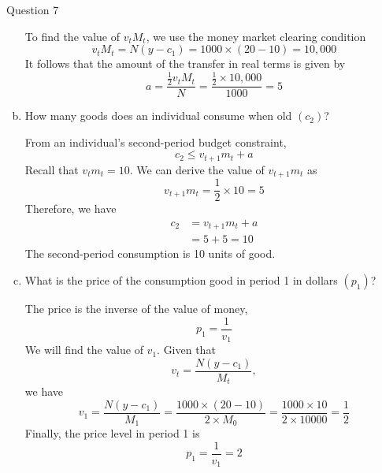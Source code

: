 \documentclass[a4paper]{article}
\newif\IfInSansMode
\numberwithin{equation}{section}
\numberwithin{figure}{section}
\begin{document}
\begin{questionbox}{Question 7}
\begin{enumerate}[(a)]
\begin{explanationbox}
\[				\]
				To find the value of \( v_tM_t \), we use the money market clearing condition
				\[
					v_tM_t = N(y-c_1) = 1000 \times (20-10) = 10,000
				\]
				It follows that the amount of the transfer in real terms is given by
				\[
					a = \frac{\frac{1}{2}v_tM_t}{N} = \frac{\frac{1}{2}\times 10,000}{1000} =  5
				\]
			\end{explanationbox}
			\item How many goods does an individual consume when old \( (c_2) \)?
			\begin{explanationbox}
				From an individual's second-period budget constraint,
				\[
					c_2 \leq v_{t+1}m_t + a
				\]
				Recall that \( v_tm_t = 10 \). We can derive the value of \( v_{t+1}m_t \) as
				\[
					v_{t+1}m_t = \frac{1}{2} \times 10 = 5
				\]
				Therefore, we have
				\begin{align*}
					c_2 &= v_{t+1}m_t + a\\
					&= 5 + 5 = 10
				\end{align*}
				The second-period consumption is 10 units of good. 
			\end{explanationbox}
			\item What is the price of the consumption good in period 1 in dollars \( (p_1) \)?
			\begin{explanationbox}
				The price is the inverse of the value of money,
				\[
					p_1 = \frac{1}{v_1}
				\]
				We will find the value of \( v_1 \). Given that
				\[
					v_t = \frac{N(y-c_1)}{M_t},
				\]
				we have
				\[
					v_1 = \frac{N(y-c_1)}{M_1} = \frac{1000 \times (20-10)}{2 \times M_0} = \frac{1000 \times 10}{2 \times 10000} = \frac{1}{2}
				\]
				Finally, the price level in period 1 is
				\[
					p_1 = \frac{1}{v_1} = 2
				\]
			\end{explanationbox}
		\end{enumerate}
	\end{questionbox}
\end{document}
